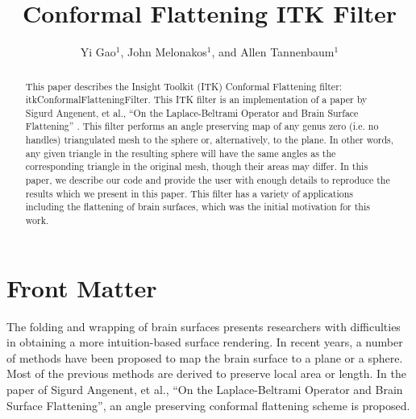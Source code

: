 \documentclass{InsightArticle}
\title{Conformal Flattening ITK Filter}
\author{Yi Gao$^{1}$, John Melonakos$^{1}$, and Allen Tannenbaum$^{1}$}
\begin{document}
	\newif\ifpdf
	\ifx\pdfoutput\undefined
  \pdffalse
	\else
  \pdftrue
	\fi


	\ifpdf
	\else
  \DeclareGraphicsExtensions{.eps,.jpg,.gif,.tiff,.bmp,.png}
  \DeclareGraphicsRule{.jpg}{eps}{.jpg.bb}{`convert #1 eps:-}
  \DeclareGraphicsRule{.gif}{eps}{.gif.bb}{`convert #1 eps:-}
  \DeclareGraphicsRule{.tiff}{eps}{.tiff.bb}{`convert #1 eps:-}
  \DeclareGraphicsRule{.bmp}{eps}{.bmp.bb}{`convert #1 eps:-}
  \DeclareGraphicsRule{.png}{eps}{.png.bb}{`convert #1 eps:-}
	\fi


	\maketitle


	\ifhtml
	\chapter*{Front Matter\label{front}}
	\fi


	\begin{abstract}
		\noindent This paper describes the Insight Toolkit (ITK) Conformal
		Flattening filter: itkConformalFlatteningFilter. This ITK filter is an
		implementation of a paper by Sigurd Angenent, et al., ``On the
		Laplace-Beltrami Operator and Brain Surface Flattening''
		\cite{angenent1999lbo}. This filter performs an angle preserving map of any
		genus zero (i.e. no handles) triangulated mesh to the sphere or,
		alternatively, to the plane. In other words, any given triangle in the
		resulting sphere will have the same angles as the corresponding
		triangle in the original mesh, though their areas may differ. In this
		paper, we describe our code and provide the user with enough details
		to reproduce the results which we present in this paper. This filter
		has a variety of applications including the flattening of brain
		surfaces, which was the initial motivation for this work.
	\end{abstract}

	\tableofcontents

	The folding and wrapping of brain surfaces presents researchers with
	difficulties in obtaining a more intuition-based surface
	rendering. In recent years, a number of methods have been proposed
	to map the brain surface to a plane or a sphere. Most of the
	previous methods are derived to preserve local area or length. In
	the paper of Sigurd Angenent, et al., ``On the Laplace-Beltrami
	Operator and Brain Surface Flattening'', an angle preserving
	conformal flattening scheme is proposed.
\end{document}

